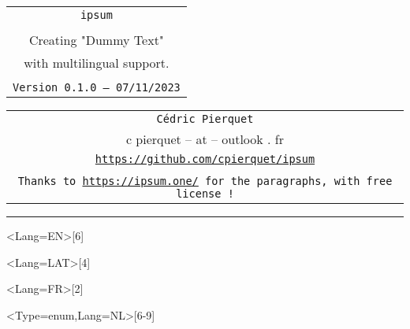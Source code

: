 \documentclass[11pt,a4paper]{ltxdoc}
\def\TPversion{0.1.0}
\def\TPdate{07/11/2023}
\begin{document}
\pagestyle{fancy}

\thispagestyle{empty}

\begin{center}
	\begin{minipage}{0.88\linewidth}
	\begin{tcolorbox}[colframe=yellow,colback=yellow!15]
		\begin{center}
			\begin{tabular}{c}
				{\Huge \texttt{ipsum}}\\
				\\
				{\LARGE Creating "Dummy Text"} \\
				{\LARGE with multilingual support.} \\
				\\
				{\small \texttt{Version \TPversion{} -- \TPdate}}
		\end{tabular}
		\end{center}
	\end{tcolorbox}
\end{minipage}
\end{center}

\begin{center}
	\begin{tabular}{c}
	\texttt{Cédric Pierquet}\\
	{\ttfamily c pierquet -- at -- outlook . fr}\\
	\texttt{\url{https://github.com/cpierquet/ipsum}} \\
	\\
	\texttt{Thanks to \url{https://ipsum.one/} for the paragraphs, with free license !}
\end{tabular}
\end{center}

\hrule

\vfill

\begin{tcolorbox}[colframe=lightgray,colback=lightgray!5]
\ipsum<Lang=EN>[6]
\end{tcolorbox}

\begin{tcolorbox}[colframe=lightgray,colback=lightgray!5]
\ipsum<Lang=LAT>[4]
\end{tcolorbox}

\begin{tcolorbox}[colframe=lightgray,colback=lightgray!5]
\ipsum<Lang=FR>[2]
\end{tcolorbox}

\begin{tcolorbox}[colframe=lightgray,colback=lightgray!5]
\ipsum<Type=enum,Lang=NL>[6-9]
\end{tcolorbox}
\end{document}
